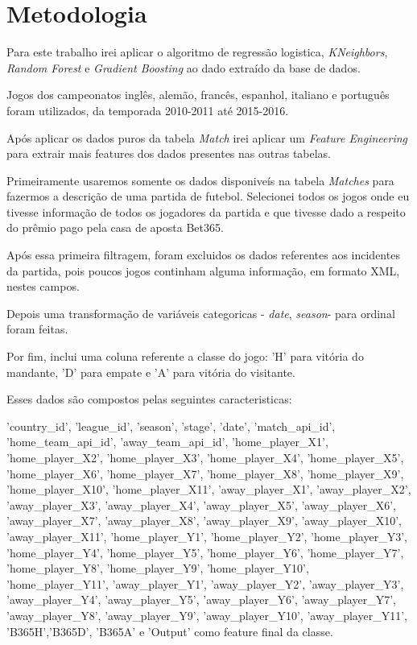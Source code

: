 \documentclass{article}
\begin{document}
\section{Metodologia}
Para este trabalho irei aplicar o algoritmo de regressão logistica, \textit{KNeighbors}, \textit{Random Forest} e \textit{Gradient Boosting} ao dado extraído da base de dados.

Jogos dos campeonatos inglês, alemão, francês, espanhol, italiano e português foram utilizados, da temporada 2010-2011 até 2015-2016.

Após aplicar os dados puros da tabela
\textit{Match} irei aplicar um \textit{Feature Engineering} para extrair mais features dos dados presentes nas outras tabelas.

Primeiramente usaremos somente os dados disponiveís na tabela \textit{Matches} para fazermos a descrição de uma partida de futebol. Selecionei todos os jogos onde eu tivesse informação de todos os jogadores da partida e que tivesse dado a respeito do prêmio pago pela casa de aposta Bet365.

Após essa primeira filtragem, foram excluidos os dados referentes aos incidentes da partida, pois poucos jogos continham alguma informação, em formato XML, nestes campos.

Depois uma transformação de variáveis categoricas - \textit{date}, \textit{season}- para ordinal foram feitas.

Por fim, inclui uma coluna referente a classe do jogo: 'H' para vitória do mandante, 'D' para empate e 'A' para vitória do visitante.

Esses dados são compostos pelas seguintes caracteristicas:

	 'country\_id', 'league\_id', 'season', 'stage',  'date', 'match\_api\_id', 'home\_team\_api\_id',  'away\_team\_api\_id', 'home\_player\_X1', 'home\_player\_X2', 'home\_player\_X3', 'home\_player\_X4', 'home\_player\_X5', 'home\_player\_X6', 'home\_player\_X7', 'home\_player\_X8', 'home\_player\_X9', 'home\_player\_X10', 'home\_player\_X11', 'away\_player\_X1', 'away\_player\_X2', 'away\_player\_X3', 'away\_player\_X4', 'away\_player\_X5', 'away\_player\_X6', 'away\_player\_X7', 'away\_player\_X8', 'away\_player\_X9', 'away\_player\_X10', 'away\_player\_X11', 'home\_player\_Y1', 'home\_player\_Y2', 'home\_player\_Y3', 'home\_player\_Y4', 'home\_player\_Y5', 'home\_player\_Y6', 'home\_player\_Y7', 'home\_player\_Y8', 'home\_player\_Y9', 'home\_player\_Y10', 'home\_player\_Y11', 'away\_player\_Y1', 'away\_player\_Y2',
	'away\_player\_Y3',
	'away\_player\_Y4', 'away\_player\_Y5', 'away\_player\_Y6', 'away\_player\_Y7', 'away\_player\_Y8', 'away\_player\_Y9',
	'away\_player\_Y10', 'away\_player\_Y11', 'B365H','B365D', 'B365A' e 'Output' como feature final da classe.
\end{document}
